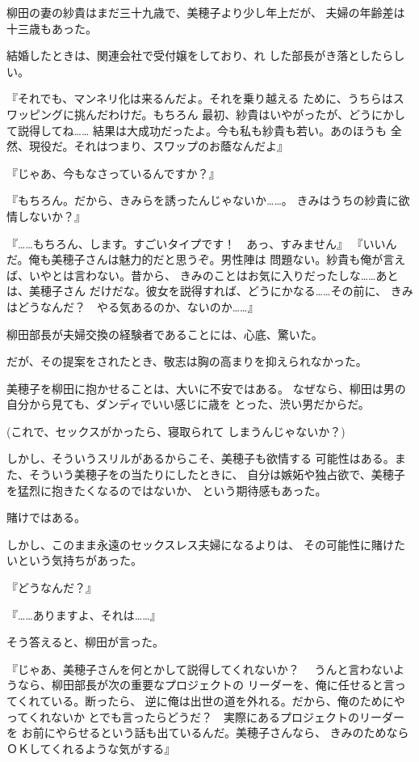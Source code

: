 ﻿\documentclass[
    book,tate,
    line_length=30zw,
    jafontsize=12pt,
    paper=b5j,
    landscape,
    ]{jlreq}
\begin{document}
柳田の妻の紗貴はまだ三十九歳で、美穂子より少し年上だが、
夫婦の年齢差は十三歳もあった。

結婚したときは、関連会社で受付嬢をしており、れ
した部長がき落としたらしい。

『それでも、マンネリ化は来るんだよ。それを乗り越える
ために、うちらはスワッピングに挑んだわけだ。もちろん
最初、紗貴はいやがったが、どうにかして説得してね……
結果は大成功だったよ。今も私も紗貴も若い。あのほうも
全然、現役だ。それはつまり、スワップのお蔭なんだよ』

『じゃあ、今もなさっているんですか？』

『もちろん。だから、きみらを誘ったんじゃないか……。
きみはうちの紗貴に欲情しないか？』

『……もちろん、します。すごいタイプです！　あっ、すみません』
『いいんだ。俺も美穂子さんは魅力的だと思うぞ。男性陣は
問題ない。紗貴も俺が言えば、いやとは言わない。昔から、
きみのことはお気に入りだったしな……あとは、美穂子さん
だけだな。彼女を説得すれば、どうにかなる……その前に、
きみはどうなんだ？　やる気あるのか、ないのか……』

柳田部長が夫婦交換の経験者であることには、心底、驚いた。

だが、その提案をされたとき、敬志は胸の高まりを抑えられなかった。

美穂子を柳田に抱かせることは、大いに不安ではある。
なぜなら、柳田は男の自分から見ても、ダンディでいい感じに歳を
とった、渋い男だからだ。

(これで、セックスがかったら、寝取られて
しまうんじゃないか？)

しかし、そういうスリルがあるからこそ、美穂子も欲情する
可能性はある。また、そういう美穂子をの当たりにしたときに、
自分は嫉妬や独占欲で、美穂子を猛烈に抱きたくなるのではないか、
という期待感もあった。

賭けではある。

しかし、このまま永遠のセックスレス夫婦になるよりは、
その可能性に賭けたいという気持ちがあった。

『どうなんだ？』

『……ありますよ、それは……』

そう答えると、柳田が言った。

『じゃあ、美穂子さんを何とかして説得してくれないか？　
うんと言わないようなら、柳田部長が次の重要なプロジェクトの
リーダーを、俺に任せると言ってくれている。断ったら、
逆に俺は出世の道を外れる。だから、俺のためにやってくれないか
とでも言ったらどうだ？　実際にあるプロジェクトのリーダーを
お前にやらせるという話も出ているんだ。美穂子さんなら、
きみのためならＯＫしてくれるような気がする』
\end{document}
